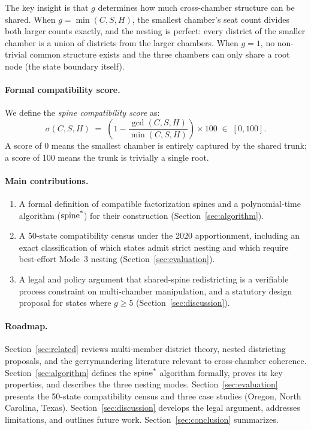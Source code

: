 The key insight is that $g$ determines how much cross-chamber structure can
be shared.  When $g = \min(C, S, H)$, the smallest chamber's seat count divides
both larger counts exactly, and the nesting is perfect: every district of the
smaller chamber is a union of districts from the larger chambers.  When $g = 1$,
no non-trivial common structure exists and the three chambers can only share a
root node (the state boundary itself).

\paragraph{Formal compatibility score.}  We define the
\emph{spine compatibility score} as:
\begin{equation}
  \label{eq:score}
  \sigma(C, S, H) \;=\; \left(1 - \frac{\gcd(C,S,H)}{\min(C,S,H)}\right) \times 100 \;\in\; [0, 100].
\end{equation}
A score of 0 means the smallest chamber is entirely captured by the shared
trunk; a score of 100 means the trunk is trivially a single root.

\paragraph{Main contributions.}
\begin{enumerate}
  \item A formal definition of compatible factorization spines and a
        polynomial-time algorithm ($\operatorname{spine^*}$) for their construction
        (Section~\ref{sec:algorithm}).
  \item A 50-state compatibility census under the 2020 apportionment, including
        an exact classification of which states admit strict nesting and which
        require best-effort Mode~3 nesting (Section~\ref{sec:evaluation}).
  \item A legal and policy argument that shared-spine redistricting is a
        verifiable process constraint on multi-chamber manipulation, and a
        statutory design proposal for states
        where $g \geq 5$ (Section~\ref{sec:discussion}).
\end{enumerate}

\paragraph{Roadmap.}  Section~\ref{sec:related} reviews multi-member district
theory, nested districting proposals, and the gerrymandering literature
relevant to cross-chamber coherence.  Section~\ref{sec:algorithm} defines
the $\operatorname{spine^*}$ algorithm formally, proves its key properties, and describes the
three nesting modes.  Section~\ref{sec:evaluation} presents the 50-state
compatibility census and three case studies (Oregon, North Carolina, Texas).
Section~\ref{sec:discussion} develops the legal argument, addresses limitations,
and outlines future work.  Section~\ref{sec:conclusion} summarizes.

